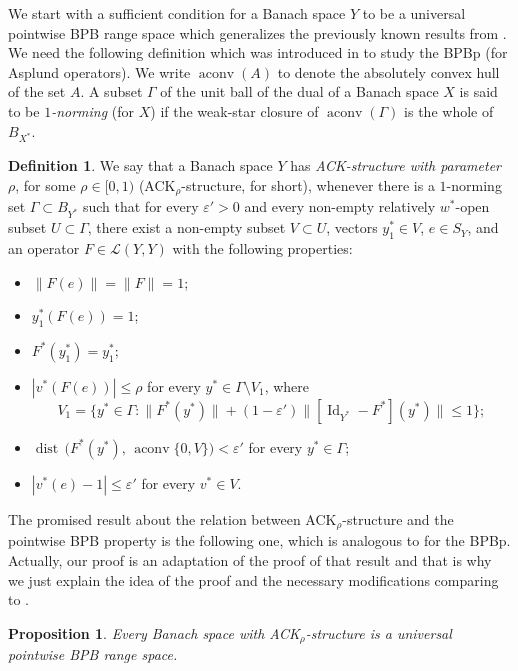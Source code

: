 \documentclass[a4paper,10pt]{amsart}
\theoremstyle{plain}
\newtheorem{proposition}[theorem]{Proposition}
\theoremstyle{definition}
\newtheorem{definition}[theorem]{Definition}
\DeclareMathOperator{\Id}{\mathrm{Id}}
\DeclareMathOperator{\dist}{dist\,}
\DeclareMathOperator{\aconv}{aconv}
\newcommand{\eps}{\varepsilon}
\renewcommand{\leq}{\leqslant}
\begin{document}
We start with a sufficient condition for a Banach space $Y$ to be a universal pointwise BPB range space which generalizes the previously known results from \cite{DKL}. We need the following definition which was introduced in \cite{CGKS} to study the BPBp (for Asplund operators). We write $\aconv(A)$ to denote the absolutely convex hull of the set $A$. A subset $\Gamma$ of the unit ball of the dual of a Banach space $X$ is said to be \emph{$1$-norming} (for $X$) if the weak-star closure of $\aconv(\Gamma)$ is the whole of $B_{X^*}$.

\begin{definition}\cite[Definition 3.1]{CGKS} \label{def-ack-str} We say that a Banach space $Y$ has \emph{ACK-structure with parameter $\rho$}, for some $\rho \in [0, 1)$ (ACK$_\rho$-structure, for short), whenever there is a $1$-norming set $\Gamma \subset B_{Y^*}$ such that for every $\eps' > 0$ and every non-empty relatively $w^*$-open subset $U \subset \Gamma$, there exist a non-empty subset $V \subset U$, vectors $y_1^* \in V$, $e \in S_Y$, and an operator $F \in \mathcal{L}(Y,Y)$ with the following properties:
	\begin{itemize}
		\item[(i)] $\|F(e)\| = \|F\| = 1$;
		\item[(ii)] $y_1^*(F(e)) = 1$;
		\item[(iii)] $F^*(y_1^*) = y_1^*$;
		\item[(iv)] $|v^*(F(e))| \leq \rho$ for every $y^* \in \Gamma \setminus V_1$, where $$V_1 = \bigl\{y^* \in \Gamma\colon \|F^*(y^*)\| + (1 -  \eps') \|[\Id_{Y^*} - F^*](y^*)\| \leq 1 \bigr\};$$
		\item[(v)] $\dist \bigl(F^*(y^*),\, \aconv\{0, V\}\bigr) <  \eps'$ for every $y^* \in \Gamma$;
		\item[(vi)] $|v^*(e) - 1| \leq  \eps'$ for every $v^* \in V$.	
	\end{itemize}
\end{definition}

The promised result about the relation between ACK$_\rho$-structure and the pointwise BPB property is the following one, which is analogous to \cite[Theorem 3.4]{CGKS} for the BPBp. Actually, our proof is an adaptation of the proof of that result and that is why we just explain the idea of the proof and the necessary modifications comparing to \cite[Theorem 3.4]{CGKS}.

\begin{proposition}\label{pointwise BPB property:ACK} Every Banach space with ACK$_{\rho}$-structure is a universal pointwise BPB range space.
\end{proposition}
\end{document}
